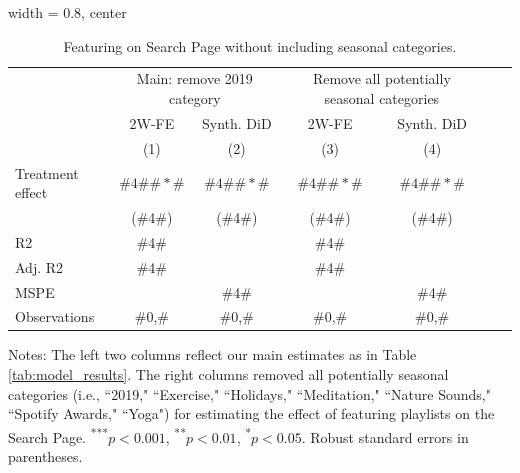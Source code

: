 \begin{table}[H]
\caption{Featuring on Search Page without including seasonal categories.\label{tab:model_robust_seasonal}}
\centering
  \begin{adjustbox}{width = 0.8\textwidth, center}
      \begin{threeparttable}[b]
\begin{tabular}{l c c c c c c}
\hline 
 & \multicolumn{2}{c}{Main: remove 2019 category } & \multicolumn{2}{c}{Remove all potentially seasonal categories}
  \tabularnewline
 & \multicolumn{1}{c}{2W-FE} & \multicolumn{1}{c}{Synth. DiD} & \multicolumn{1}{c}{2W-FE} & \multicolumn{1}{c}{Synth. DiD} \tabularnewline
 & \multicolumn{1}{c}{(1)} & \multicolumn{1}{c}{(2)} & \multicolumn{1}{c}{(3)} & \multicolumn{1}{c}{(4)}\tabularnewline
\hline 
Treatment effect & $\#4\# \#*\#$ & $\#4\# \#*\#$ & $\#4\# \#*\#$ & $\#4\# \#*\#$ \tabularnewline
 & (\#4\#) & (\#4\#) & (\#4\#) & (\#4\#) \tabularnewline
\hline 
R2 & \multicolumn{1}{c}{\#4\#} & \multicolumn{1}{c}{} & \multicolumn{1}{c}{\#4\#} & \multicolumn{1}{c}{} \tabularnewline
Adj. R2 & \multicolumn{1}{c}{\#4\#} & \multicolumn{1}{c}{} & \multicolumn{1}{c}{\#4\#} & \multicolumn{1}{c}{} \tabularnewline
MSPE & \multicolumn{1}{c}{} & \multicolumn{1}{c}{\#4\#} & \multicolumn{1}{c}{} & \multicolumn{1}{c}{\#4\#}\tabularnewline
Observations & \multicolumn{1}{c}{\#0,\#} & \multicolumn{1}{c}{\#0,\#} & \multicolumn{1}{c}{\#0,\#} & \multicolumn{1}{c}{\#0,\#}\tabularnewline
\hline 
\end{tabular}
\begin{tablenotes}\footnotesize
   \vspace{-0.2cm}
   \footnotesize
    \item Notes: The left two columns reflect our main estimates as in Table \ref{tab:model_results}. The right columns removed all potentially seasonal categories (i.e., ``2019," ``Exercise," ``Holidays," ``Meditation," ``Nature Sounds," ``Spotify Awards," ``Yoga") for estimating the effect of featuring playlists on the Search Page. 
  \textsuperscript{***}$p<0.001$, 
  \textsuperscript{**}$p<0.01$, 
  \textsuperscript{*}$p<0.05$. Robust standard errors in parentheses.
         \end{tablenotes}
      \end{threeparttable}
   \end{adjustbox}
\end{table}
